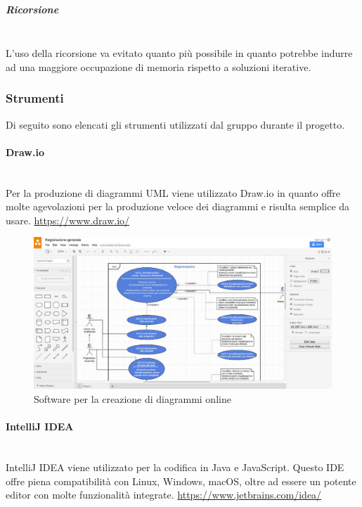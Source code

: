 			\subparagraph{Ricorsione} \mbox{}\\
			L'uso della ricorsione va evitato quanto più possibile in  quanto  potrebbe
			indurre  ad  una  maggiore  occupazione  di  memoria  rispetto  a  soluzioni
			iterative.
	\subsubsection{Strumenti}
	Di seguito sono elencati gli strumenti utilizzati dal gruppo durante il progetto.
		\paragraph{Draw.io} \mbox{}\\
		Per la produzione di diagrammi UML viene utilizzato Draw.io in quanto offre molte agevolazioni per la produzione veloce dei diagrammi e risulta semplice da usare.
		\url{https://www.draw.io/}
		\begin{figure}[H]
			\includegraphics[width=0.99\linewidth]{res/images/drawio.jpg}
			\caption{Software per la creazione di diagrammi online}
		\end{figure} 
		\paragraph{IntelliJ IDEA} \mbox{}\\
		IntelliJ IDEA viene utilizzato per la codifica in Java e JavaScript. Questo IDE offre piena compatibilità con Linux, Windows, macOS, oltre ad essere un potente editor con molte funzionalità integrate.
		\url{https://www.jetbrains.com/idea/}

